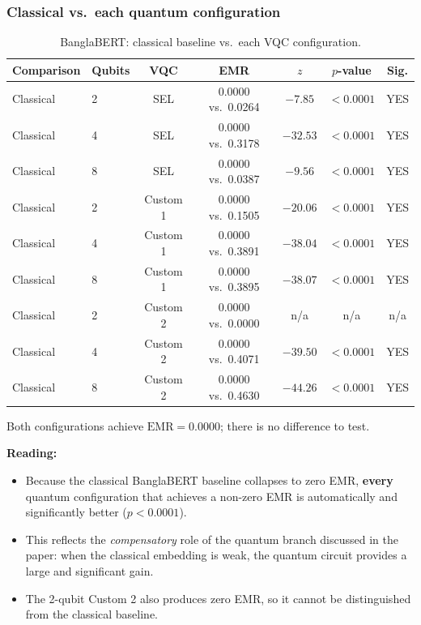 \documentclass[11pt]{article}
\begin{document}
\subsubsection*{Classical vs.\ each quantum configuration}
\begin{table}[h!]
\centering
\small
\begin{threeparttable}
\begin{tabular}{llccccc}
\toprule
\textbf{Comparison} & \textbf{Qubits} & \textbf{VQC} & \textbf{EMR} & $z$ & $p$-value & \textbf{Sig.} \\
\midrule
Classical & 2 & SEL     & 0.0000 vs.\ 0.0264 & $-7.85$ & $<0.0001$ & YES \\
Classical & 4 & SEL     & 0.0000 vs.\ 0.3178 & $-32.53$ & $<0.0001$ & YES \\
Classical & 8 & SEL     & 0.0000 vs.\ 0.0387 & $-9.56$ & $<0.0001$ & YES \\
\addlinespace
Classical & 2 & Custom 1 & 0.0000 vs.\ 0.1505 & $-20.06$ & $<0.0001$ & YES \\
Classical & 4 & Custom 1 & 0.0000 vs.\ 0.3891 & $-38.04$ & $<0.0001$ & YES \\
Classical & 8 & Custom 1 & 0.0000 vs.\ 0.3895 & $-38.07$ & $<0.0001$ & YES \\
\addlinespace
Classical & 2 & Custom 2 & 0.0000 vs.\ 0.0000 & n/a & n/a\tnote{$\ddagger$} & n/a \\
Classical & 4 & Custom 2 & 0.0000 vs.\ 0.4071 & $-39.50$ & $<0.0001$ & YES \\
Classical & 8 & Custom 2 & 0.0000 vs.\ 0.4630 & $-44.26$ & $<0.0001$ & YES \\
\bottomrule
\end{tabular}
\begin{tablenotes}
\small
\item[$\ddagger$] Both configurations achieve $\text{EMR}=0.0000$; there is no difference to test.
\end{tablenotes}
\end{threeparttable}
\caption{BanglaBERT: classical baseline vs.\ each VQC configuration.}
\end{table}

\noindent\textbf{Reading:}
\begin{itemize}
    \item Because the classical BanglaBERT baseline collapses to zero EMR, \textbf{every} quantum configuration that
    achieves a non-zero EMR is automatically and significantly better ($p<0.0001$).
    \item This reflects the \emph{compensatory} role of the quantum branch discussed in the paper: when the classical
    embedding is weak, the quantum circuit provides a large and significant gain.
    \item The 2-qubit Custom 2 also produces zero EMR, so it cannot be distinguished from the classical baseline.
\end{itemize}
\end{document}
